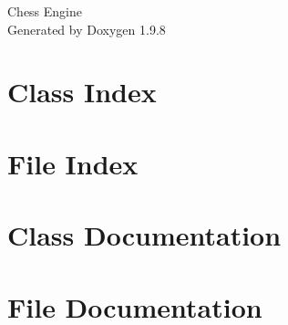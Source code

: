 \documentclass[twoside]{book}
\newcommand{\+}{\discretionary{\mbox{\scriptsize$\hookleftarrow$}}{}{}}
\newcommand{\clearemptydoublepage}{%
    \newpage{\pagestyle{empty}\cleardoublepage}%
  }
\begin{document}
  \raggedbottom
    \hypersetup{pageanchor=false,
                bookmarksnumbered=true,
                pdfencoding=unicode
               }
  \begin{titlepage}
  \vspace*{7cm}
  \begin{center}%
  {\Large Chess Engine}\\
  \vspace*{1cm}
  {\large Generated by Doxygen 1.9.8}\\
  \end{center}
  \end{titlepage}
  \clearemptydoublepage
  \tableofcontents
  \clearemptydoublepage
  \hypersetup{pageanchor=true}
\chapter{Class Index}

\chapter{File Index}

\chapter{Class Documentation}






\chapter{File Documentation}














  \backmatter
  \newpage
  \clearemptydoublepage
  \printindex
\end{document}
